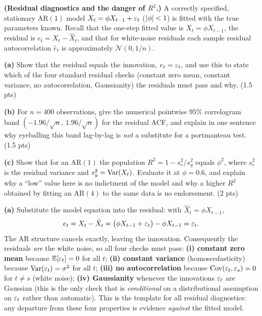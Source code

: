 \documentclass[11pt]{article}
\begin{document}

\statementstart
\textbf{(Residual diagnostics and the danger of $R^2$.)} A correctly specified, stationary AR$(1)$ model $X_t=\phi X_{t-1}+\varepsilon_t$ ($\left\lvert \phi \right\rvert<1$) is fitted with the true parameters known. Recall that the one-step fitted value is $\hat X_t=\phi X_{t-1}$, the residual is $e_t=X_t-\hat X_t$, and that for white-noise residuals each sample residual autocorrelation $\hat r_\tau$ is approximately $\mathcal N(0,1/n)$.

\textbf{(a)} Show that the residual equals the innovation, $e_t=\varepsilon_t$, and use this to state which of the four standard residual checks (constant zero mean, constant variance, no autocorrelation, Gaussianity) the residuals must pass and why. \hfill(1.5 pts)

\textbf{(b)} For $n=400$ observations, give the numerical pointwise $95\%$ correlogram band $(-1.96/\sqrt n,\,1.96/\sqrt n)$ for the residual ACF, and explain in one sentence why eyeballing this band lag-by-lag is \emph{not} a substitute for a portmanteau test. \hfill(1.5 pts)

\textbf{(c)} Show that for an AR$(1)$ the population $R^2=1-s_e^2/s_y^2$ equals $\phi^2$, where $s_e^2$ is the residual variance and $s_y^2=\operatorname{Var}(X_t)$. Evaluate it at $\phi=0.6$, and explain why a ``low'' value here is no indictment of the model and why a higher $R^2$ obtained by fitting an AR$(4)$ to the same data is no endorsement. \hfill(2 pts)
\statementend

\textbf{(a)} Substitute the model equation into the residual: with $\hat X_t=\phi X_{t-1}$,
\[
e_t=X_t-\hat X_t=\bigl(\phi X_{t-1}+\varepsilon_t\bigr)-\phi X_{t-1}=\varepsilon_t .
\]
The AR structure cancels exactly, leaving the innovation. Consequently the residuals \emph{are} the white noise, so all four checks must pass: \textbf{(i) constant zero mean} because $\mathbb{E}[\varepsilon_t]=0$ for all $t$; \textbf{(ii) constant variance} (homoscedasticity) because $\operatorname{Var}(\varepsilon_t)=\sigma^2$ for all $t$; \textbf{(iii) no autocorrelation} because $\operatorname{Cov}(\varepsilon_t,\varepsilon_s)=0$ for $t\ne s$ (white noise); \textbf{(iv) Gaussianity} whenever the innovations $\varepsilon_t$ are Gaussian (this is the only check that is \emph{conditional} on a distributional assumption on $\varepsilon_t$ rather than automatic). This is the template for all residual diagnostics: any departure from these four properties is evidence \emph{against} the fitted model.
\end{document}
